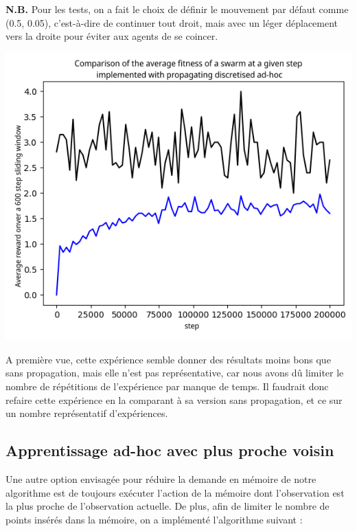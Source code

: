 \documentclass[a4paper, 12pt]{report}
\begin{document}
	
	\textbf{N.B.} Pour les tests, on a fait le choix de définir le mouvement par défaut comme (0.5, 0.05), c'est-à-dire de continuer tout droit, mais avec un léger déplacement vers la droite pour éviter aux agents de se coincer.

\begin{center}
	\includegraphics{D2Propag}
\end{center}	
A première vue, cette expérience semble donner des résultats moins bons que sans propagation, mais elle n'est pas représentative, car nous avons dû limiter le nombre de répétitions de l'expérience par manque de temps. Il faudrait donc refaire cette expérience en la comparant à sa version sans propagation, et ce sur un nombre représentatif d'expériences.
	
	
	\subsection{Apprentissage ad-hoc avec plus proche voisin}
	Une autre option envisagée pour réduire la demande en mémoire de notre algorithme est de toujours exécuter l'action de la mémoire dont l'observation est la plus proche de l'observation actuelle.
	De plus, afin de limiter le nombre de points insérés dans la mémoire, on a implémenté l'algorithme suivant :

	
\end{document}
